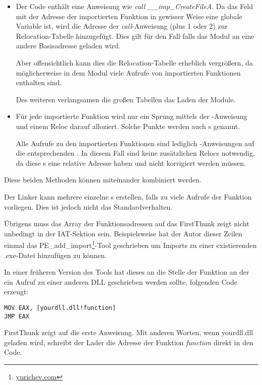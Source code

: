 \begin{itemize}
\item Der Code enthält eine Anweisung wie \emph{call \_\_imp\_CreateFileA}. Da das Feld
mit der Adresse der importierten Funktion in gewisser Weise eine globale Variable
ist, wird die Adresse der \emph{call}-Anweisung (plus 1 oder 2) zur Relocation-Tabelle
hinzugefügt. Dies gilt für den Fall falls das Modul an eine andere Basisadresse
geladen wird.

Aber offensichtlich kann dies die Relocation-Tabelle erheblich vergrößern, da
möglicherweise in dem Modul viele Aufrufe von importierten Funktionen enthalten sind.

Des weiteren verlangsamen die großen Tabellen das Laden der Module.

\item Für jede importierte Funktion wird nur ein Sprung mittels der \JMP-Anweisung
und einem Reloc darauf alloziert.
Solche Punkte werden auch s genannt.

Alle Aufrufe zu den importierten Funktionen sind lediglich \CALL-Anweisungen auf
die entsprechenden .
In diesem Fall sind keine zusätzlichen Relocs notwendig, da diese \CALL{}s eine
relative Adresse haben und nicht korrigiert werden müssen.
\end{itemize}

Diese beiden Methoden können miteinander kombiniert werden.

Der Linker kann mehrere einzelne s erstellen, falls zu viele Aufrufe der
Funktion vorliegen. Dies ist jedoch nicht das Standardverhalten.

Übrigens muss das Array der Funktionsadressen auf das FirstThunk zeigt nicht unbedingt
in der \ac{IAT}-Sektion sein. Beispielsweise hat der Autor dieser Zeilen einmal das
PE\_add\_import\footnote{\href{http://go.yurichev.com/17049}{yurichev.com}}-Tool
geschrieben um Imports zu einer existierenden .exe-Datei hinzufügen zu können.

In einer früheren Version des Tools hat dieses an die Stelle der Funktion an der
ein Aufruf zu einer anderen DLL geschrieben werden sollte, folgenden Code erzeugt:

\begin{lstlisting}
MOV EAX, [yourdll.dll!function]
JMP EAX
\end{lstlisting}

FirstThunk zeigt auf die erste Anweisung. Mit anderen Worten, wenn yourdll.dll
geladen wird, schreibt der Lader die Adresse der Funktion \emph{function} direkt
in den Code.

